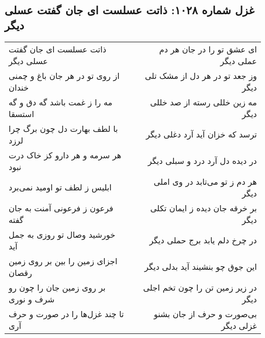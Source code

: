 \begin{center}
\section*{غزل شماره ۱۰۲۸: ذاتت عسلست ای جان گفتت عسلی دیگر}
\label{sec:1028}
\begin{longtable}{l p{0.5cm} r}
ذاتت عسلست ای جان گفتت عسلی دیگر
&&
ای عشق تو را در جان هر دم عملی دیگر
\\
از روی تو در هر جان باغ و چمنی خندان
&&
وز جعد تو در هر دل از مشک تلی دیگر
\\
مه را ز غمت باشد گه دق و گه استسقا
&&
مه زین خللی رسته از صد خللی دیگر
\\
با لطف بهارت دل چون برگ چرا لرزد
&&
ترسد که خزان آید آرد دغلی دیگر
\\
هر سرمه و هر دارو کز خاک درت نبود
&&
در دیده دل آرد درد و سبلی دیگر
\\
ابلیس ز لطف تو اومید نمی‌برد
&&
هر دم ز تو می‌تابد در وی املی دیگر
\\
فرعون ز فرعونی آمنت به جان گفته
&&
بر خرقه جان دیده ز ایمان تکلی دیگر
\\
خورشید وصال تو روزی به جمل آید
&&
در چرخ دلم یابد برج حملی دیگر
\\
اجزای زمین را بین بر روی زمین رقصان
&&
این جوق چو بنشیند آید بدلی دیگر
\\
بر روی زمین جان را چون رو شرف و نوری
&&
در زیر زمین تن را چون تخم اجلی دیگر
\\
تا چند غزل‌ها را در صورت و حرف آری
&&
بی‌صورت و حرف از جان بشنو غزلی دیگر
\\
\end{longtable}
\end{center}
